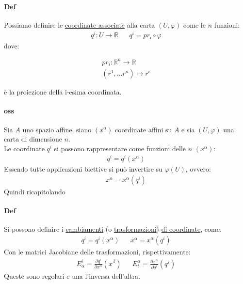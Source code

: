 \paragraph{Def} Possiamo definire le \underline{coordinate associate} alla carta $(U,\varphi)$ come le $n$ funzioni:
\begin{align*}
    q^i\colon U\to \mathbb{R}&&
    q^i=pr_i\circ \varphi
\end{align*}
dove:\begin{minipage}{4cm}
\begin{align*}
pr_i\colon\mathbb{R}^n\to \mathbb{R}\\
    (r^1,...r^n)\mapsto r^i
\end{align*}
\end{minipage}
\begin{minipage}{7cm}
è la proiezione della i-esima coordinata.
\end{minipage}
\paragraph{oss} Sia $A$ uno spazio affine, siano $(x^\alpha)$ coordinate affini su $A$ e sia $(U,\varphi)$ una carta di dimensione $n$.\\
Le coordinate $q^i$ si possono rappresentare come funzioni delle $n$ $(x^\alpha)$:
\begin{align*}
    q^i=q^i(x^\alpha)
\end{align*}
Essendo tutte applicazioni biettive si può invertire su $\varphi (U)$, ovvero:
\begin{align*}
    x^\alpha=x^\alpha(q^i)
\end{align*}
Quindi ricapitolando
\paragraph{Def} Si possono definire i \underline{cambiamenti} (o \underline{trasformazioni}) \underline{di coordinate}, come:
\begin{align*}
    q^i=q^i(x^\alpha) && x^\alpha=x^\alpha(q^i)
\end{align*}
Con le matrici Jacobiane delle trasformazioni, rispettivamente:
\begin{align*}
    E^i_\alpha= \frac{\partial q^i}{\partial x^\alpha} (x^\beta) && E^\alpha_i= \frac{\partial x^\alpha}{\partial q^i} (q^j)
\end{align*}
Queste sono regolari e una l'inversa dell'altra.
